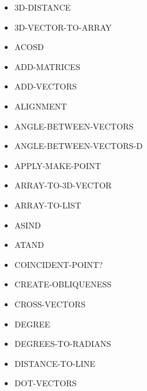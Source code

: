 \documentclass [11pt]{book}
\begin{document}
\label{subsec:functionandmacrodefinitions}



\begin{itemize}

\item {}3D-DISTANCE

\item {}3D-VECTOR-TO-ARRAY

\item {}ACOSD

\item {}ADD-MATRICES

\item {}ADD-VECTORS

\item {}ALIGNMENT

\item {}ANGLE-BETWEEN-VECTORS

\item {}ANGLE-BETWEEN-VECTORS-D

\item {}APPLY-MAKE-POINT

\item {}ARRAY-TO-3D-VECTOR

\item {}ARRAY-TO-LIST

\item {}ASIND

\item {}ATAND

\item {}COINCIDENT-POINT?

\item {}CREATE-OBLIQUENESS

\item {}CROSS-VECTORS

\item {}DEGREE

\item {}DEGREES-TO-RADIANS

\item {}DISTANCE-TO-LINE

\item {}DOT-VECTORS


\end{itemize}
\end{document}
